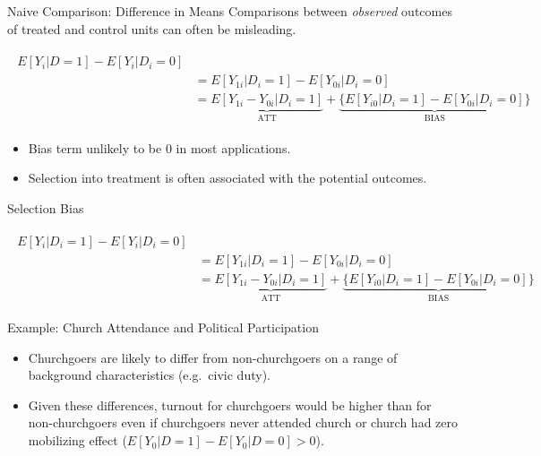 \documentclass{beamer}
\numberwithin{equation}{section}
\begin{document}
\begin{frame}{Naive Comparison: Difference in Means}
\small
Comparisons between \emph{observed} outcomes of treated and control
units can often be misleading.

\begin{scriptsize}
\begin{align}
\begin{split}
E[Y_i|D=1]-E[Y_i|D_i=0] \\
&=E[Y_{1i} | D_i=1]-E[Y_{0i} | D_i=0]\\
                 &=\underbrace{E[Y_{1i} - Y_{0i} | D_i=1]}_{\mbox{ATT}}
                 +\underbrace{\{ E[Y_{i0} | D_i=1]- E[Y_{0i} | D_i=0]\}}_{\mbox{BIAS}}\nonumber
\end{split}
\end{align}
\end{scriptsize}

\begin{itemize}
\itemsep1pt\parskip0pt
\item
  Bias term unlikely to be 0 in most applications.
\item
  Selection into treatment is often associated with the potential
  outcomes.
\end{itemize}

\end{frame}

\begin{frame}{Selection Bias}
\small
\begin{scriptsize}
\begin{align}
\begin{split}
E[Y_i|D_i=1]-E[Y_i|D_i=0] \\
&=E[Y_{1i} | D_i=1]-E[Y_{0i} | D_i=0]\\
                 &=\underbrace{E[Y_{1i} - Y_{0i} | D_i=1]}_{\mbox{ATT}}
                 +\underbrace{\{ E[Y_{i0} | D_i=1]- E[Y_{0i} | D_i=0]\}}_{\mbox{BIAS}}\nonumber
\end{split}
\end{align}
\end{scriptsize}

Example: Church Attendance and Political Participation

\begin{itemize}
\itemsep1pt\parskip0pt
\item
  Churchgoers are likely to differ from non-churchgoers on a range of
  background characteristics (e.g.~civic duty).\medskip
\item
  Given these differences, turnout for churchgoers would be higher than
  for non-churchgoers even if churchgoers never attended church or
  church had zero mobilizing effect
  ($E[Y_0 | D=1]-E[Y_0 | D=0]>0$).
\end{itemize}

\end{frame}
\end{document}
